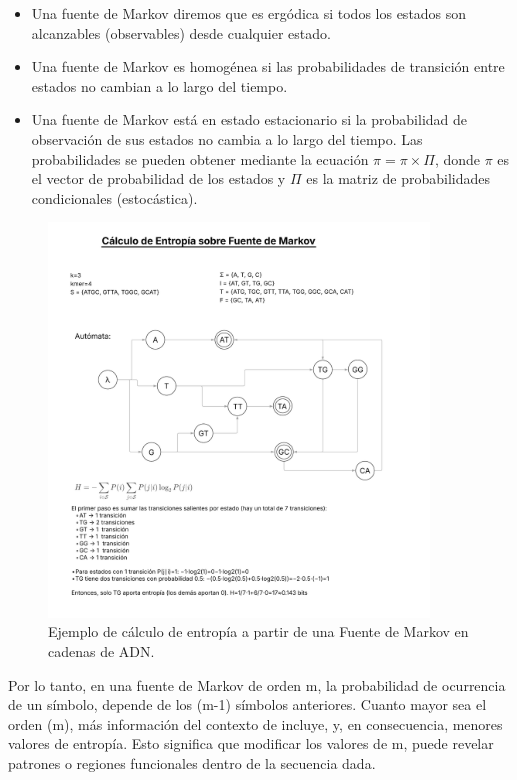 \documentclass[11pt,spanish,listoffigures,listoftables]{tfgetsinf}
\begin{document}
\begin{itemize}
   \item Una fuente de Markov diremos que es ergódica si todos los estados son alcanzables (observables) desde cualquier estado.
   \item Una fuente de Markov es homogénea si las probabilidades de transición entre estados no cambian a lo largo del tiempo.
   \item Una fuente de Markov está en estado estacionario si la probabilidad de observación de sus estados no cambia a lo largo del tiempo. Las probabilidades se pueden obtener mediante la ecuación $\pi = \pi \times \Pi$, donde $\pi$ es el vector de probabilidad de los estados y $\Pi$ es la matriz de probabilidades condicionales (estocástica).
\end{itemize}

\begin{figure}[H]
   \centering
   \includegraphics[width=0.9\textwidth]{entropia_markov_ADN.png}
   \caption{Ejemplo de cálculo de entropía a partir de una Fuente de Markov en cadenas de \ac{ADN}.}
   \label{fig:etiqueta_opcional4}
\end{figure}

Por lo tanto, en una fuente de Markov de orden m, la probabilidad de ocurrencia de un símbolo, depende de los (m-1) símbolos anteriores. Cuanto mayor sea el orden (m), más información del contexto de incluye, y, en consecuencia, menores valores de entropía. Esto significa que modificar los valores de m, puede revelar patrones o regiones funcionales dentro de la secuencia dada. 
\end{document}
